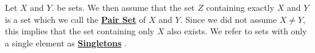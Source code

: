 \newcommand{\PairSet}[0]{\textbf{\hyperref[def:PairSet]{Pair Set}}\xspace}
\newcommand{\PairSets}[0]{\textbf{\hyperref[def:PairSet]{Pair Sets}}\xspace}
\newcommand{\Singleton}[0]{\textbf{\hyperref[def:PairSet]{Singleton}}\xspace}
\newcommand{\Singletons}[0]{\textbf{\hyperref[def:PairSet]{Singletons}\xspace}
}\begin{df}
\label{def:PairSet}

\rm
    Let $X$ and $Y$. be sets. 
    We then assume that the set $Z$ 
    containing exactly $X$ and $Y$ is a 
    set which we call the \PairSet of $X$ and $Y$. 
    Since we did not assume
    $X \neq Y$, this implies that the 
    set containing only $X$ also exists. 
    We refer to sets with only a single element 
    as \Singletons.
\end{df}
